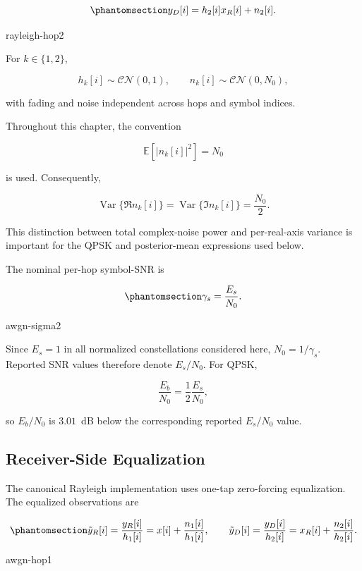 \begin{equation}\protect\phantomsection\label{eq:rayleigh-hop2}
y_D[i]
=
h_2[i]x_R[i]+n_2[i].
\end{equation}
{\protect\numberline{\theequation}\quad rayleigh-hop2}

For $k\in\{1,2\}$,

\[
h_k[i]\sim\mathcal{CN}(0,1),
\qquad
n_k[i]\sim\mathcal{CN}(0,N_0),
\]

with fading and noise independent across hops and symbol indices.

Throughout this chapter, the convention

\[
\mathbb{E}[|n_k[i]|^2]=N_0
\]

is used. Consequently,

\[
\operatorname{Var}\{\Re n_k[i]\}
=
\operatorname{Var}\{\Im n_k[i]\}
=
\frac{N_0}{2}.
\]

This distinction between total complex-noise power and per-real-axis
variance is important for the QPSK and posterior-mean expressions used
below.

The nominal per-hop symbol-SNR is

\begin{equation}\protect\phantomsection\label{eq:awgn-sigma2}
\gamma_s
=
\frac{E_s}{N_0}.
\end{equation}
{\protect\numberline{\theequation}\quad awgn-sigma2}

Since $E_s=1$ in all normalized constellations considered here,
$N_0=1/\gamma_s$. Reported SNR values therefore denote $E_s/N_0$.
For QPSK,

\[
\frac{E_b}{N_0}
=
\frac{1}{2}\frac{E_s}{N_0},
\]

so $E_b/N_0$ is $3.01$~dB below the corresponding reported
$E_s/N_0$ value.


\subsection{Receiver-Side Equalization}

The canonical Rayleigh implementation uses one-tap zero-forcing
equalization. The equalized observations are

\begin{equation}\protect\phantomsection\label{eq:awgn-hop1}
\tilde y_R[i]
=
\frac{y_R[i]}{h_1[i]}
=
x[i]+\frac{n_1[i]}{h_1[i]},
\qquad
\tilde y_D[i]
=
\frac{y_D[i]}{h_2[i]}
=
x_R[i]+\frac{n_2[i]}{h_2[i]}.
\end{equation}
{\protect\numberline{\theequation}\quad awgn-hop1}

